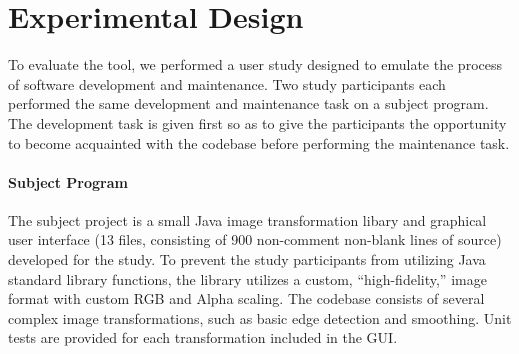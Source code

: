 \documentclass[nocopyrightspace,10pt]{sigplanconf}
\begin{document}
\section{Experimental Design}
\label{sec:eval}


To evaluate the tool, we performed a user study designed to
emulate the process of software development and maintenance.  Two study participants
each performed the same development and maintenance task on a subject
program. The development task is given first so as to give the
participants the opportunity to become acquainted with the codebase
before performing the maintenance task.

\paragraph{Subject Program}
The subject project is a small Java image transformation libary and
graphical user interface (13 files, consisting of 900 non-comment
non-blank lines of source) developed for the study. To prevent the
study participants from utilizing Java standard library functions, the
library utilizes a custom, ``high-fidelity,'' image format with custom
RGB and Alpha scaling. The codebase consists of several complex image
transformations, such as basic edge detection and smoothing. Unit tests
are provided for each transformation included in the GUI.


\end{document}
